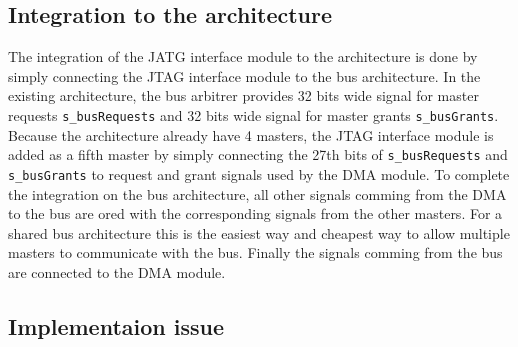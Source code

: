 \documentclass[a4paper,11pt,oneside]{report}
\begin{document}
\subsection{Integration to the architecture}

The integration of the JATG interface module to the architecture is done by simply connecting the JTAG interface module to the bus architecture.
In the existing architecture, the bus arbitrer provides 32 bits wide signal for master requests \texttt{s\_busRequests} and 32 bits wide signal for master grants \texttt{s\_busGrants}.
Because the architecture already have 4 masters, the JTAG interface module is added as a fifth master by simply connecting the 27th bits of \texttt{s\_busRequests} and \texttt{s\_busGrants} 
to request and grant signals used by the DMA module.
To complete the integration on the bus architecture, all other signals comming from the DMA to the bus are ored with the corresponding signals from the other masters. For 
a shared bus architecture this is the easiest way and cheapest way to allow multiple masters to communicate with the bus.
Finally the signals comming from the bus are connected to the DMA module.

\subsection{Implementaion issue}
\end{document}
